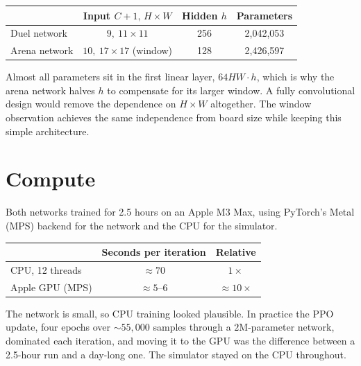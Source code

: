 \begin{center}
\begin{tabular}{@{}lccc@{}}
\toprule
& \textbf{Input} $C{+}1,\,H{\times}W$ & \textbf{Hidden} $h$ & \textbf{Parameters}\\
\midrule
Duel network & $9,\ 11\times11$ & 256 & 2{,}042{,}053\\
Arena network & $10,\ 17\times17$ (window) & 128 & 2{,}426{,}597\\
\bottomrule
\end{tabular}
\end{center}

Almost all parameters sit in the first linear layer, $64HW\cdot h$, which is why the arena
network halves $h$ to compensate for its larger window. A fully convolutional design
would remove the dependence on $H\times W$ altogether. The window observation achieves
the same independence from board size while keeping this simple architecture.

\section{Compute}

Both networks trained for 2.5 hours on an Apple M3 Max, using PyTorch's Metal (MPS)
backend for the network and the CPU for the simulator.

\begin{center}
\begin{tabular}{@{}lcc@{}}
\toprule
& \textbf{Seconds per iteration} & \textbf{Relative}\\
\midrule
CPU, 12 threads & $\approx 70$ & $1\times$\\
Apple GPU (MPS) & $\approx 5$--$6$ & $\approx 10\times$\\
\bottomrule
\end{tabular}
\end{center}

\begin{warnbox}
The network is small, so CPU training looked plausible. In practice the PPO update,
four epochs over $\sim55{,}000$ samples through a $2$M-parameter network, dominated each
iteration, and moving it to the GPU was the difference between a 2.5-hour run and a
day-long one. The simulator stayed on the CPU throughout.
\end{warnbox}
